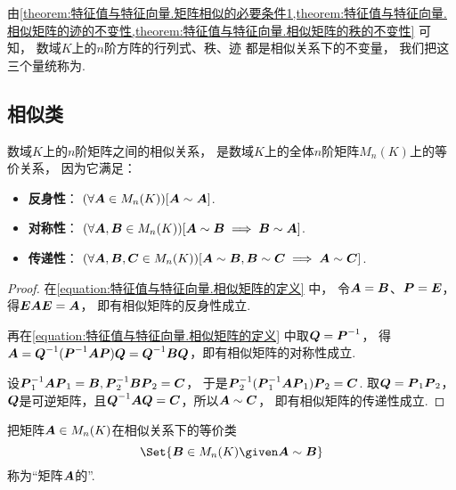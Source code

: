\begin{remark}
由\cref{theorem:特征值与特征向量.矩阵相似的必要条件1,theorem:特征值与特征向量.相似矩阵的迹的不变性,theorem:特征值与特征向量.相似矩阵的秩的不变性} 可知，
数域\(K\)上的\(n\)阶方阵的行列式、秩、迹
都是相似关系下的不变量，
我们把这三个量统称为.
\end{remark}

\subsection{相似类}
\begin{property}\label{theorem:特征值与特征向量.相似关系是等价关系}
数域\(K\)上的\(n\)阶矩阵之间的相似关系，
是数域\(K\)上的全体\(n\)阶矩阵\(M_n(K)\)上的等价关系，
因为它满足：\begin{itemize}
	\item {\rm\bf 反身性}：
	\((\forall \boldsymbol{A} \in M_n(K))
	[\boldsymbol{A}\sim\boldsymbol{A}]\).

	\item {\rm\bf 对称性}：
	\((\forall \boldsymbol{A},\boldsymbol{B} \in M_n(K))
	[\boldsymbol{A} \sim \boldsymbol{B} \implies \boldsymbol{B} \sim \boldsymbol{A}]\).

	\item {\rm\bf 传递性}：
	\((\forall \boldsymbol{A},\boldsymbol{B},\boldsymbol{C} \in M_n(K))
	[\boldsymbol{A} \sim \boldsymbol{B}, \boldsymbol{B} \sim \boldsymbol{C} \implies \boldsymbol{A} \sim \boldsymbol{C}]\).
\end{itemize}
\begin{proof}
在\cref{equation:特征值与特征向量.相似矩阵的定义} 中，
令\(\boldsymbol{A}=\boldsymbol{B}\)、\(\boldsymbol{P}=\boldsymbol{E}\)，得\(\boldsymbol{E}\boldsymbol{A}\boldsymbol{E}=\boldsymbol{A}\)，
即有相似矩阵的反身性成立.

再在\cref{equation:特征值与特征向量.相似矩阵的定义} 中取\(\boldsymbol{Q}=\boldsymbol{P}^{-1}\)，
得\(\boldsymbol{A} = \boldsymbol{Q}^{-1}(\boldsymbol{P}^{-1}\boldsymbol{A}\boldsymbol{P})\boldsymbol{Q} = \boldsymbol{Q}^{-1}\boldsymbol{B}\boldsymbol{Q}\)，即有相似矩阵的对称性成立.

设\(\boldsymbol{P}_1^{-1}\boldsymbol{A}\boldsymbol{P}_1=\boldsymbol{B},
\boldsymbol{P}_2^{-1}\boldsymbol{B}\boldsymbol{P}_2=\boldsymbol{C}\)，
于是\(\boldsymbol{P}_2^{-1}(\boldsymbol{P}_1^{-1}\boldsymbol{A}\boldsymbol{P}_1)\boldsymbol{P}_2=\boldsymbol{C}\).
取\(\boldsymbol{Q}=\boldsymbol{P}_1\boldsymbol{P}_2\)，\(\boldsymbol{Q}\)是可逆矩阵，且\(\boldsymbol{Q}^{-1}\boldsymbol{A}\boldsymbol{Q}=\boldsymbol{C}\)，所以\(\boldsymbol{A}\sim\boldsymbol{C}\)，
即有相似矩阵的传递性成立.
\end{proof}
\end{property}

\begin{definition}
把矩阵\(\boldsymbol{A} \in M_n(K)\)在相似关系下的等价类\[
	\Set{ \vb{B} \in M_n(K) \given \vb{A}\sim\vb{B} }
\]称为“矩阵\(\boldsymbol{A}\)的”.
\end{definition}

